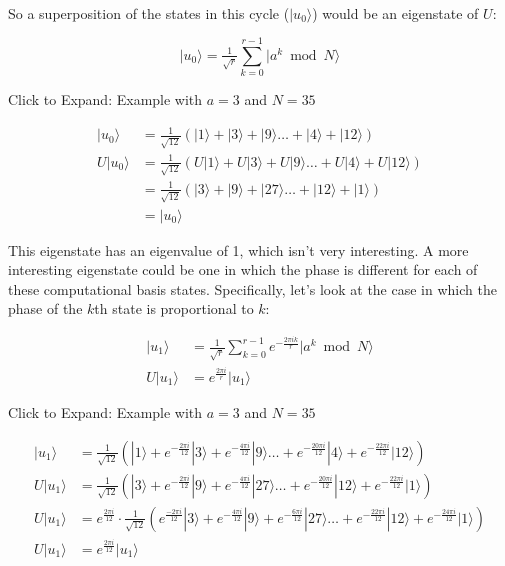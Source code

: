 \documentclass[11pt]{article}
\newcommand{\prompt}[4]{
        \ttfamily\llap{{\color{#2}[#3]:\hspace{3pt}#4}}\vspace{-\baselineskip}
    }
\begin{document}
            
\prompt{Out}{outcolor}{4}{}
    
    \begin{center}
    \end{center}
    { \hspace*{\fill} \\}
    

    So a superposition of the states in this cycle (\(|u_0\rangle\)) would
be an eigenstate of \(U\):

\[|u_0\rangle = \tfrac{1}{\sqrt{r}}\sum_{k=0}^{r-1}{|a^k \bmod N\rangle} \]

 Click to Expand: Example with \(a = 3\) and \(N=35\)

\[\begin{aligned}
|u_0\rangle &= \tfrac{1}{\sqrt{12}}(|1\rangle + |3\rangle + |9\rangle \dots + |4\rangle + |12\rangle) \\[10pt]
U|u_0\rangle &= \tfrac{1}{\sqrt{12}}(U|1\rangle + U|3\rangle + U|9\rangle \dots + U|4\rangle + U|12\rangle) \\[10pt]
 &= \tfrac{1}{\sqrt{12}}(|3\rangle + |9\rangle + |27\rangle \dots + |12\rangle + |1\rangle) \\[10pt]
 &= |u_0\rangle
\end{aligned}\]

This eigenstate has an eigenvalue of 1, which isn't very interesting. A
more interesting eigenstate could be one in which the phase is different
for each of these computational basis states. Specifically, let's look
at the case in which the phase of the \(k\)th state is proportional to
\(k\):

\[\begin{aligned}
|u_1\rangle &= \tfrac{1}{\sqrt{r}}\sum_{k=0}^{r-1}{e^{-\tfrac{2\pi i k}{r}}|a^k \bmod N\rangle}\\[10pt]
U|u_1\rangle &= e^{\tfrac{2\pi i}{r}}|u_1\rangle 
\end{aligned}
\]

 Click to Expand: Example with \(a = 3\) and \(N=35\)

\[\begin{aligned}
|u_1\rangle &= \tfrac{1}{\sqrt{12}}(|1\rangle + e^{-\tfrac{2\pi i}{12}}|3\rangle + e^{-\tfrac{4\pi i}{12}}|9\rangle \dots + e^{-\tfrac{20\pi i}{12}}|4\rangle + e^{-\tfrac{22\pi i}{12}}|12\rangle) \\[10pt]
U|u_1\rangle &= \tfrac{1}{\sqrt{12}}(|3\rangle + e^{-\tfrac{2\pi i}{12}}|9\rangle + e^{-\tfrac{4\pi i}{12}}|27\rangle \dots + e^{-\tfrac{20\pi i}{12}}|12\rangle + e^{-\tfrac{22\pi i}{12}}|1\rangle) \\[10pt]
U|u_1\rangle &= e^{\tfrac{2\pi i}{12}}\cdot\tfrac{1}{\sqrt{12}}(e^{\tfrac{-2\pi i}{12}}|3\rangle + e^{-\tfrac{4\pi i}{12}}|9\rangle + e^{-\tfrac{6\pi i}{12}}|27\rangle \dots + e^{-\tfrac{22\pi i}{12}}|12\rangle + e^{-\tfrac{24\pi i}{12}}|1\rangle) \\[10pt]
U|u_1\rangle &= e^{\tfrac{2\pi i}{12}}|u_1\rangle
\end{aligned}\]
\end{document}
